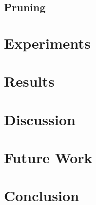 \documentclass[11pt,twocolumn]{scrartcl}
\begin{document}
\subsection{Pruning}


\section{Experiments}


\section{Results}


\section{Discussion}


\section{Future Work}


\section{Conclusion}



\end{document}
